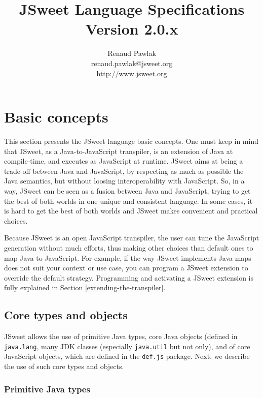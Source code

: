\documentclass[a4paper]{report}
\begin{document}
\title{JSweet Language Specifications\\{\large Version 2.0.x}}
\author{%
Renaud Pawlak\\
{\normalsize renaud.pawlak@jsweet.org}\\
{\normalsize http://www.jsweet.org}\\
}%
\date{}
\maketitle

\tableofcontents

\chapter{Basic concepts} 

This section presents the JSweet language basic concepts. One must keep in mind that JSweet, as a Java-to-JavaScript transpiler, is an extension of Java at compile-time, and executes as JavaScript at runtime. JSweet aims at being a trade-off between Java and JavaScript, by respecting as much as possible the Java semantics, but without loosing interoperability with JavaScript. So, in a way, JSweet can be seen as a fusion between Java and JavaScript, trying to get the best of both worlds in one unique and consistent language. In some cases, it is hard to get the best of both worlds and JSweet makes convenient and practical choices.

Because JSweet is an open JavaScript transpiler, the user can tune the JavaScript generation without much efforts, thus making other choices than default ones to map Java to JavaScript. For example, if the way JSweet implements Java maps does not suit your context or use case, you can program a JSweet extension to override the default strategy. Programming and activating a JSweet extension is fully explained in Section \ref{extending-the-transpiler}.

\section{Core types and objects}

JSweet allows the use of primitive Java types, core Java objects (defined in \texttt{java.lang}, many JDK classes (especially \texttt{java.util} but not only), and of core JavaScript objects, which are defined in the \texttt{def.js} package. Next, we describe the use of such core types and objects.

\subsection{Primitive Java types}
\end{document}
